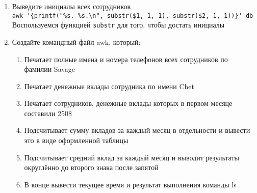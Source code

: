 \documentclass[12pt, a4paper]{article}
\begin{document}
\begin{enumerate}
    \verb|awk -F ":" '/^Mike/ {printf("$%s, $%s, $%s\n", $3, $4, $5)}' db|\\
    Воспользуемся функцией \verb|printf| чтобы отформатировать строку согласно
    заданию
  \item Выведите инициалы всех сотрудников\\
    \verb|awk '{printf("%s. %s.\n", substr($1, 1, 1), substr($2, 1, 1))}' db|\\
    Воспользуемся функцией \verb|substr| для того, чтобы достать инициалы
  \item Создайте командный файл awk, который:
    \begin{enumerate}
      \item Печатает полные имена и номера телефонов всех сотрудников по фамилии Savage
      \item Печатает денежные вклады сотрудника по имени Chet
      \item Печатает сотрудников, денежные вклады которых в первом месяце составили 250\$
      \item Подсчитывает сумму вкладов за каждый месяц в отдельности и вывести это в виде оформленной таблицы
      \item Подсчитывает средний вклад за каждый месяц и выводит результаты округлённо до второго знака после запятой
      \item В конце вывести текущее время и результат выполнения команды ls
    \end{enumerate}
    
\end{enumerate}
\end{document}
